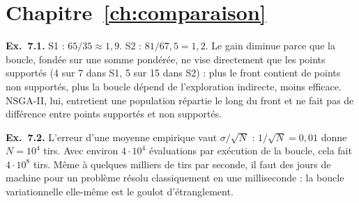 \section*{Chapitre~\ref{ch:comparaison}}
\textbf{Ex.~7.1.} S1 : $65/35\approx1{,}9$. S2 : $81/67{,}5=1{,}2$. Le gain diminue parce que la boucle, fondée sur une somme pondérée, ne vise directement que les points supportés (4 sur 7 dans S1, 5 sur 15 dans S2) : plus le front contient de points non supportés, plus la boucle dépend de l'exploration indirecte, moins efficace. NSGA-II, lui, entretient une population répartie le long du front et ne fait pas de différence entre points supportés et non supportés.

\textbf{Ex.~7.2.} L'erreur d'une moyenne empirique vaut $\sigma/\sqrt{N}$ : $1/\sqrt N=0{,}01$ donne $N=10^4$ tirs. Avec environ $4\cdot10^4$ évaluations par exécution de la boucle, cela fait $4\cdot10^8$ tirs. Même à quelques milliers de tirs par seconde, il faut des jours de machine pour un problème résolu classiquement en une milliseconde : la boucle variationnelle elle-même est le goulot d'étranglement.
